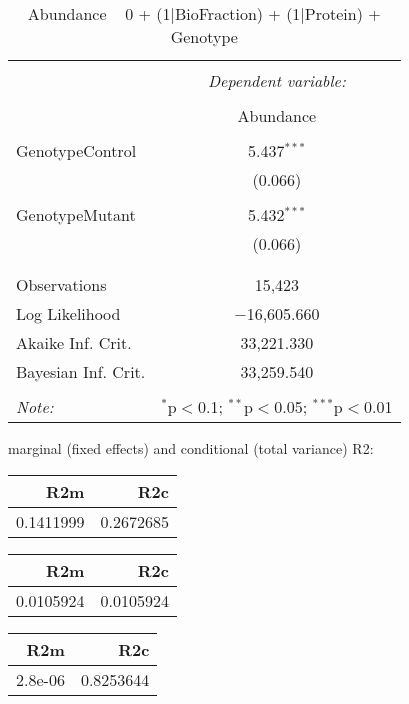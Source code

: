 \documentclass[11pt]{report}
\begin{document}
\begin{table}[!htbp] \centering 
  \caption{Abundance ~ 0 + (1|BioFraction) + (1|Protein) + Genotype} 
  \label{} 
\begin{tabular}{@{\extracolsep{5pt}}lc} 
\\[-1.8ex]\hline 
\hline \\[-1.8ex] 
 & \multicolumn{1}{c}{\textit{Dependent variable:}} \\ 
\cline{2-2} 
\\[-1.8ex] & Abundance \\ 
\hline \\[-1.8ex] 
 GenotypeControl & 5.437$^{***}$ \\ 
  & (0.066) \\ 
  & \\ 
 GenotypeMutant & 5.432$^{***}$ \\ 
  & (0.066) \\ 
  & \\ 
\hline \\[-1.8ex] 
Observations & 15,423 \\ 
Log Likelihood & $-$16,605.660 \\ 
Akaike Inf. Crit. & 33,221.330 \\ 
Bayesian Inf. Crit. & 33,259.540 \\ 
\hline 
\hline \\[-1.8ex] 
\textit{Note:}  & \multicolumn{1}{r}{$^{*}$p$<$0.1; $^{**}$p$<$0.05; $^{***}$p$<$0.01} \\ 
\end{tabular} 
\end{table} 
marginal (fixed effects) and conditional (total variance) R2:

\begin{tabular}{r|r}
\hline
R2m & R2c\\
\hline
0.1411999 & 0.2672685\\
\hline
\end{tabular}

\begin{tabular}{r|r}
\hline
R2m & R2c\\
\hline
0.0105924 & 0.0105924\\
\hline
\end{tabular}

\begin{tabular}{r|r}
\hline
R2m & R2c\\
\hline
2.8e-06 & 0.8253644\\
\hline
\end{tabular}
\end{document}
